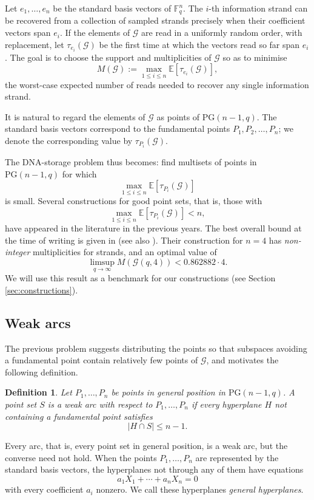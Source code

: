 \documentclass{article}
\newtheorem{definition}{Definition}
\newcommand{\Gscr}{\mathscr{G}}
\begin{document}
Let $e_1,\ldots,e_n$ be the standard basis vectors of $\mathbb F_q^n$. The $i$-th information strand can be recovered from a collection of sampled strands precisely when their coefficient vectors span $e_i$. If the elements of $\mathcal G$ are read in a uniformly random order, with replacement, let $\tau_{e_i}(\mathcal G)$ be the first time at which the vectors read so far span $e_i$. The goal is to choose the support and multiplicities of $\mathcal G$ so as to minimise
\[
    M(\mathcal G)
    :=\max_{1\leq i\leq n}\mathbb E[\tau_{e_i}(\mathcal G)],
\]
the worst-case expected number of reads needed to recover any single information strand.

It is natural to regard the elements of $\mathcal G$ as points of $\mathrm{PG}(n-1,q)$. The standard basis vectors correspond to the fundamental points $P_1,P_2,\ldots,P_n$; we denote the corresponding value by $\tau_{P_i}(\mathcal G)$.

The DNA-storage problem thus becomes: find multisets of points in $\mathrm{PG}(n-1,q)$ for which
\[
    \max_{1\leq i\leq n}\mathbb E[\tau_{P_i}(\mathcal G)]
\]
is small.
Several constructions for good point sets, that is, those with \[\max_{1\leq i\leq n}\mathbb E[\tau_{P_i}(\mathcal G)]<n,\]  have appeared in the literature in the previous years. The best overall bound at the time of writing is given in \cite{WangYaakobi2026} (see also \cite{BodurEtAl2025}). Their construction for $n=4$ has {\em non-integer} multiplicities for strands, and an optimal value of \[
 \limsup_{q\to\infty}M(\Gscr(q,4))<0.862882\cdot4.
\]
We will use this result as a benchmark for our constructions (see Section \ref{sec:constructions}).


\subsection{Weak arcs}

The previous problem suggests distributing the points so that subspaces avoiding a fundamental point contain relatively few points of $\mathcal G$, and motivates the following definition.

\begin{definition}
Let $P_1,\ldots,P_n$ be points in general position in $\mathrm{PG}(n-1,q)$. A point set $S$ is a \emph{weak arc with respect to $P_1,\ldots,P_n$} if every hyperplane $H$ not containing a fundamental point satisfies
\[
    |H\cap S|\leq n-1.
\]
\end{definition}

Every arc, that is, every point set in general position, is a weak arc, but the converse need not hold. When the points $P_1,\ldots,P_n$ are represented by the standard basis vectors, the hyperplanes not through any of them have equations
\[
    a_1X_1+\cdots+a_nX_n=0
\]
with every coefficient $a_i$ nonzero. We call these hyperplanes \emph{general hyperplanes}.
\end{document}
